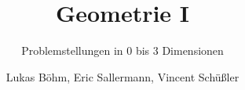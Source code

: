 \documentclass[18pt]{beamer}
\title[Vortrag Geometrie I]{Geometrie I}
\subtitle{Problemstellungen in 0 bis 3 Dimensionen}
\author{Lukas Böhm, Eric Sallermann, Vincent Schüßler}
\institute{ICPC Basispraktikum SS2014}
\begin{document}

\begin{frame}
\titlepage
\end{frame}





\end{document}
